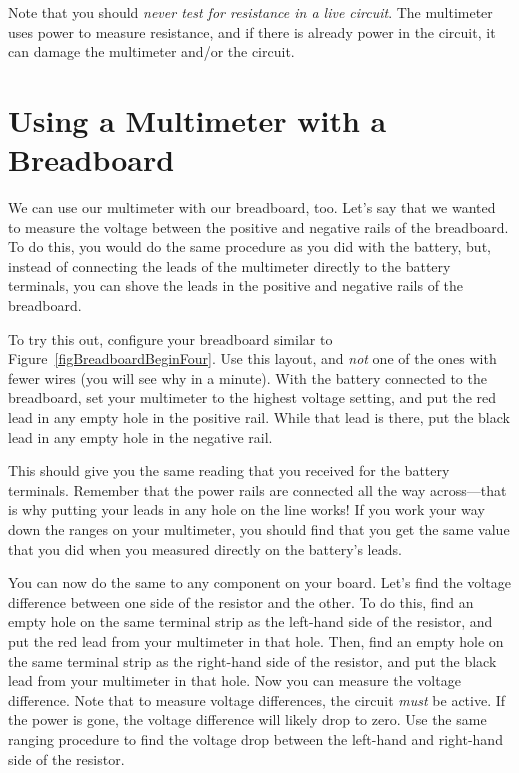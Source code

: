 Note that you should \emph{never test for resistance in a live circuit}.
The multimeter uses power to measure resistance, and if there is already power in the circuit, it can damage the multimeter and/or the circuit.

\section{Using a Multimeter with a Breadboard}

We can use our multimeter with our breadboard, too.
Let's say that we wanted to measure the voltage between the positive and negative rails of the breadboard.
To do this, you would do the same procedure as you did with the battery, but, instead of connecting the leads of the multimeter directly to the battery terminals, you can shove the leads in the positive and negative rails of the breadboard.

To try this out, configure your breadboard similar to Figure~\ref{figBreadboardBeginFour}.  
Use this layout, and \emph{not} one of the ones with fewer wires (you will see why in a minute).
With the battery connected to the breadboard, set your multimeter to the highest voltage setting, and put the red lead in any empty hole in the positive rail.
While that lead is there, put the black lead in any empty hole in the negative rail.

This should give you the same reading that you received for the battery terminals.
Remember that the power rails are connected all the way across---that is why putting your leads in any hole on the line works!
If you work your way down the ranges on your multimeter, you should find that you get the same value that you did when you measured directly on the battery's leads.

You can now do the same to any component on your board.
Let's find the voltage difference between one side of the resistor and the other.
To do this, find an empty hole on the same terminal strip as the left-hand side of the resistor, and put the red lead from your multimeter in that hole.
Then, find an empty hole on the same terminal strip as the right-hand side of the resistor, and put the black lead from your multimeter in that hole.
Now you can measure the voltage difference.
Note that to measure voltage differences, the circuit \emph{must} be active.
If the power is gone, the voltage difference will likely drop to zero.
Use the same ranging procedure to find the voltage drop between the left-hand and right-hand side of the resistor.

